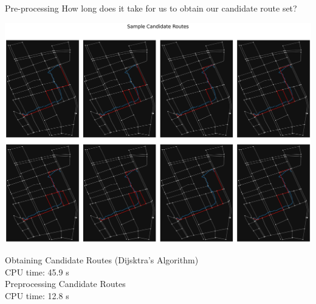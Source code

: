\documentclass[aspectratio=169, bigfiles, professionalfonts, hyperref={colorlinks=true, allcolors=., urlcolor=blue}]{beamer}
\begin{document}
\begin{frame}{Pre-processing}
	How long does it take for us to obtain our candidate route set?
	\begin{minipage}{.7\textwidth}
        \centering
        \includegraphics[width=\textwidth,height=0.8\textheight,keepaspectratio]{candidateroutes.png}
\end{minipage}
\begin{minipage}{.29\textwidth}
\begin{small}
\ttfamily
Obtaining Candidate Routes (Dijsktra's Algorithm)\\
CPU time: 45.9 s\\
\vfill
Preprocessing Candidate Routes\\
CPU time: 12.8 s
\end{small}
\end{minipage}
\end{frame}


% 
\end{document}
